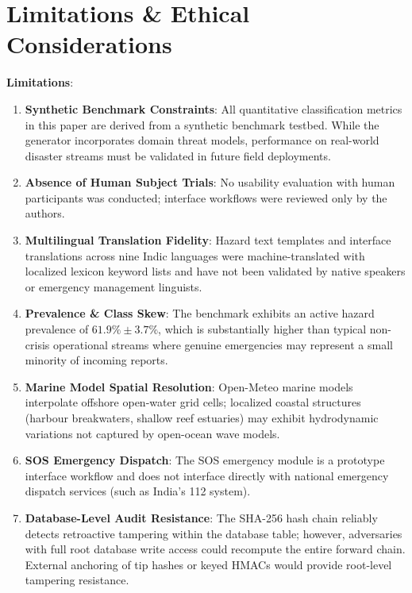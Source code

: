 \documentclass[conference]{IEEEtran}
\begin{document}
\section{Limitations \& Ethical Considerations}
\textbf{Limitations}:
\begin{enumerate}
    \item \textbf{Synthetic Benchmark Constraints}: All quantitative classification metrics in this paper are derived from a synthetic benchmark testbed. While the generator incorporates domain threat models, performance on real-world disaster streams must be validated in future field deployments.
    \item \textbf{Absence of Human Subject Trials}: No usability evaluation with human participants was conducted; interface workflows were reviewed only by the authors.
    \item \textbf{Multilingual Translation Fidelity}: Hazard text templates and interface translations across nine Indic languages were machine-translated with localized lexicon keyword lists and have not been validated by native speakers or emergency management linguists.
    \item \textbf{Prevalence \& Class Skew}: The benchmark exhibits an active hazard prevalence of $61.9\% \pm 3.7\%$, which is substantially higher than typical non-crisis operational streams where genuine emergencies may represent a small minority of incoming reports.
    \item \textbf{Marine Model Spatial Resolution}: Open-Meteo marine models interpolate offshore open-water grid cells; localized coastal structures (harbour breakwaters, shallow reef estuaries) may exhibit hydrodynamic variations not captured by open-ocean wave models.
    \item \textbf{SOS Emergency Dispatch}: The SOS emergency module is a prototype interface workflow and does not interface directly with national emergency dispatch services (such as India's 112 system).
    \item \textbf{Database-Level Audit Resistance}: The SHA-256 hash chain reliably detects retroactive tampering within the database table; however, adversaries with full root database write access could recompute the entire forward chain. External anchoring of tip hashes or keyed HMACs would provide root-level tampering resistance.
\end{enumerate}
\end{document}
